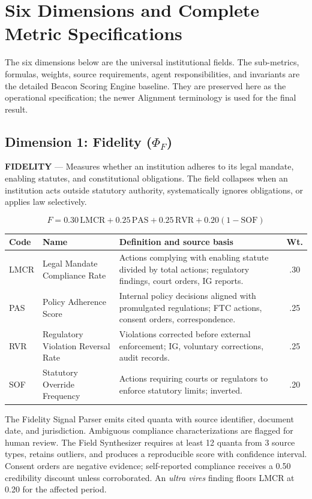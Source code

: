 \section{Six Dimensions and Complete Metric Specifications}

The six dimensions below are the universal institutional fields. The
sub-metrics, formulas, weights, source requirements, agent responsibilities,
and invariants are the detailed Beacon Scoring Engine baseline. They are
preserved here as the operational specification; the newer Alignment
terminology is used for the final result.

\subsection{Dimension 1: Fidelity (\(\Phi_F\))}

\begin{invariantbox}
\textbf{FIDELITY} --- Measures whether an institution adheres to its legal
mandate, enabling statutes, and constitutional obligations. The field
collapses when an institution acts outside statutory authority, systematically
ignores obligations, or applies law selectively.
\end{invariantbox}

\[
F = 0.30\,\mathrm{LMCR}+0.25\,\mathrm{PAS}+0.25\,\mathrm{RVR}+0.20(1-\mathrm{SOF})
\]

\begin{center}
\begin{tabular}{p{1.4cm}p{4cm}p{6.7cm}c}
\toprule
Code & Name & Definition and source basis & Wt. \\
\midrule
LMCR & Legal Mandate Compliance Rate & Actions complying with enabling statute divided by total actions; regulatory findings, court orders, IG reports. & .30 \\
PAS & Policy Adherence Score & Internal policy decisions aligned with promulgated regulations; FTC actions, consent orders, correspondence. & .25 \\
RVR & Regulatory Violation Reversal Rate & Violations corrected before external enforcement; IG, voluntary corrections, audit records. & .25 \\
SOF & Statutory Override Frequency & Actions requiring courts or regulators to enforce statutory limits; inverted. & .20 \\
\bottomrule
\end{tabular}
\end{center}

The Fidelity Signal Parser emits cited quanta with source identifier,
document date, and jurisdiction. Ambiguous compliance characterizations are
flagged for human review. The Field Synthesizer requires at least 12 quanta
from 3 source types, retains outliers, and produces a reproducible score with
confidence interval. Consent orders are negative evidence; self-reported
compliance receives a 0.50 credibility discount unless corroborated. An
\emph{ultra vires} finding floors LMCR at 0.20 for the affected period.


